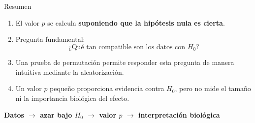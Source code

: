 \documentclass[11pt, aspectratio=169]{beamer}
\begin{document}
\begin{frame}{Resumen}

\begin{enumerate}
    \item El valor $p$ se calcula \textbf{suponiendo que la hipótesis nula
    es cierta}.

    \item Pregunta fundamental:
    \[
    \text{¿Qué tan compatible son los datos con }H_0?
    \]

    \item Una prueba de permutación permite responder esta pregunta
    de manera intuitiva mediante la aleatorización.

    \item Un valor $p$ pequeño proporciona evidencia contra $H_0$,
    pero no mide el tamaño ni la importancia biológica del efecto.
\end{enumerate}

\vspace{0.4cm}

\begin{center}
\Large
\textbf{Datos $\rightarrow$ azar bajo $H_0$ $\rightarrow$ valor $p$
$\rightarrow$ interpretación biológica}
\end{center}

\end{frame}

\end{document}
